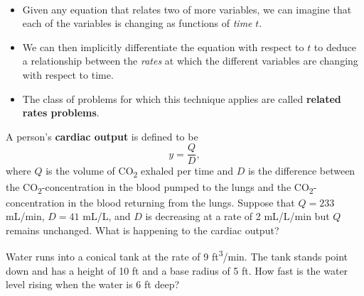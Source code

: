 \setcounter{chapter}{3}
\setcounter{section}{8}
\setcounter{theorem}{0}
\setcounter{equation}{0}


\begin{remark}\,
\begin{itemize}
\item Given any equation that relates two of more variables, we can imagine that each of the variables is changing as functions of \textit{time} $t$.
\item We can then implicitly differentiate the equation with respect to $t$ to deduce a relationship between the \textit{rates} at which the different variables are changing with respect to time.
\item The class of problems for which this technique applies are called \textbf{related rates problems}.
\end{itemize}
\end{remark}

\begin{example}
A person's \textbf{cardiac output} is defined to be
\begin{equation*}
y = \frac{Q}{D},
\end{equation*}
where $Q$ is the volume of \si{CO_2} exhaled per time and $D$ is the difference between the \si{CO_2}-concentration in the blood pumped to the lungs and the \si{CO_2}-concentration in the blood returning from the lungs.
Suppose that $Q=233$ \si{mL/min}, $D=41$ \si{mL/L}, and $D$ is decreasing at a rate of 2 \si{mL/L/min} but $Q$ remains unchanged.
What is happening to the cardiac output?
\end{example}

\newpage

\begin{example}
Water runs into a conical tank at the rate of 9 \si{ft^3/min}.
The tank stands point down and has a height of 10 \si{ft} and a base radius of 5 \si{ft}.
How fast is the water level rising when the water is 6 \si{ft} deep?
\end{example}

\newpage

